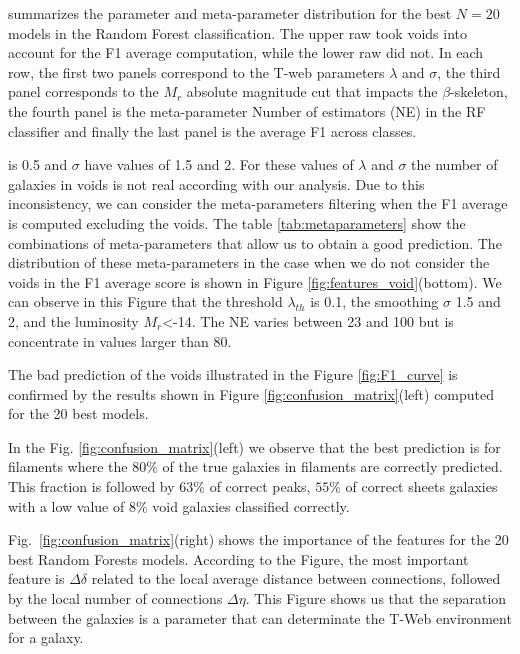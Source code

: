 \documentclass[usenatbib]{mnras}
\begin{document}
\label{fig:features_score} summarizes the parameter and meta-parameter
distribution for the best $N=20$ models in the Random Forest
classification.
The upper raw took voids into account for the F1 average computation,
while the lower raw did not.
In each row, the first two panels correspond to the T-web parameters
$\lambda$ and $\sigma$, the third panel corresponds to the $M_r$
absolute magnitude cut that impacts the $\beta$-skeleton, the fourth
panel is the meta-parameter Number of estimators (NE) in the RF
classifier and finally the last panel is the average F1 across
classes. 







is 0.5 and $\sigma$ have values of 1.5 and 2. For these
values of $\lambda$ and $\sigma$ the number of galaxies in voids is not real according with our analysis. Due to this inconsistency, we can consider the meta-parameters filtering when the F1 average is computed excluding the voids. The table \ref{tab:metaparameters} show the combinations of meta-parameters that allow us to obtain a good prediction. The distribution of these meta-parameters
in the case when we do not consider the voids in the F1 average score is shown in Figure \ref{fig:features_void}(bottom). We can
observe in this Figure that the threshold $\lambda_{th}$ is 0.1, the smoothing $\sigma$ 1.5 and 2, and the luminosity $M_r$<-14. The NE varies between 23 and 100 but is concentrate in values larger than 80. 

The bad prediction of the voids illustrated in the Figure
\ref{fig:F1_curve} is confirmed by the results shown in
Figure \ref{fig:confusion_matrix}(left) computed for the 20 best models.  

In the Fig. \ref{fig:confusion_matrix}(left) we observe that the best prediction is for filaments where the $80\%$ of the true galaxies in filaments are correctly predicted. 
This fraction is followed by $63\%$ of correct peaks, $55\%$ of
correct sheets galaxies with a low value of $8\%$ void galaxies
classified correctly. 

Fig.~\ref{fig:confusion_matrix}(right) shows the importance of the features
for the 20 best Random Forests models. According to the Figure, the 
most important feature is $\Delta \delta$
related to the local average distance between connections, followed by
the local number of connections $\Delta \eta$. This Figure shows
us that the separation between the galaxies is a parameter that can determinate the T-Web environment for a galaxy. 
\end{document}
